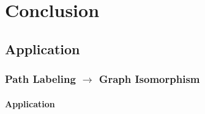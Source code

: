\documentclass[12pt,
               color={usenames,   %
                      dvipsnames},%
                    ]{beamer}
\begin{document}




\section{Conclusion}
\subsection{Application}
\frame
{
    \frametitle{Path Labeling $\rightarrow$  Graph Isomorphism}
    \framesubtitle{Application} 

}
\end{document}
